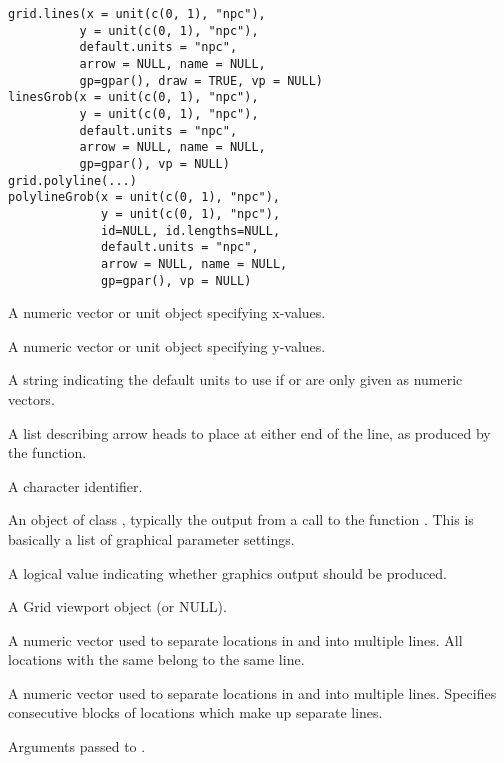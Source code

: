 %
\begin{Usage}
\begin{verbatim}
grid.lines(x = unit(c(0, 1), "npc"),
          y = unit(c(0, 1), "npc"), 
          default.units = "npc", 
          arrow = NULL, name = NULL,
          gp=gpar(), draw = TRUE, vp = NULL)
linesGrob(x = unit(c(0, 1), "npc"),
          y = unit(c(0, 1), "npc"), 
          default.units = "npc", 
          arrow = NULL, name = NULL,
          gp=gpar(), vp = NULL)
grid.polyline(...)
polylineGrob(x = unit(c(0, 1), "npc"),
             y = unit(c(0, 1), "npc"), 
             id=NULL, id.lengths=NULL,
             default.units = "npc", 
             arrow = NULL, name = NULL,
             gp=gpar(), vp = NULL)
\end{verbatim}
\end{Usage}
%
\begin{Arguments}
\begin{ldescription}
\item[\code{x}] A numeric vector or unit object specifying x-values.
\item[\code{y}] A numeric vector or unit object specifying y-values.
\item[\code{default.units}] A string indicating the default units to use
if  or  are only given as numeric vectors. 
\item[\code{arrow}] A list describing arrow heads to place at either end
of the line, as produced by the  function.
\item[\code{name}]  A character identifier. 
\item[\code{gp}] An object of class , typically the output
from a call to the function .  This is basically
a list of graphical parameter settings.
\item[\code{draw}] A logical value indicating whether graphics output
should be produced.
\item[\code{vp}] A Grid viewport object (or NULL).
\item[\code{id}] A numeric vector used to separate locations in  and
 into multiple lines.  All locations with the same
 belong to the same line.
\item[\code{id.lengths}] A numeric vector used to separate locations in  and
 into multiple lines.  Specifies consecutive blocks of
locations which make up separate lines.
\item[\code{...}] Arguments passed to .
\end{ldescription}
\end{Arguments}
